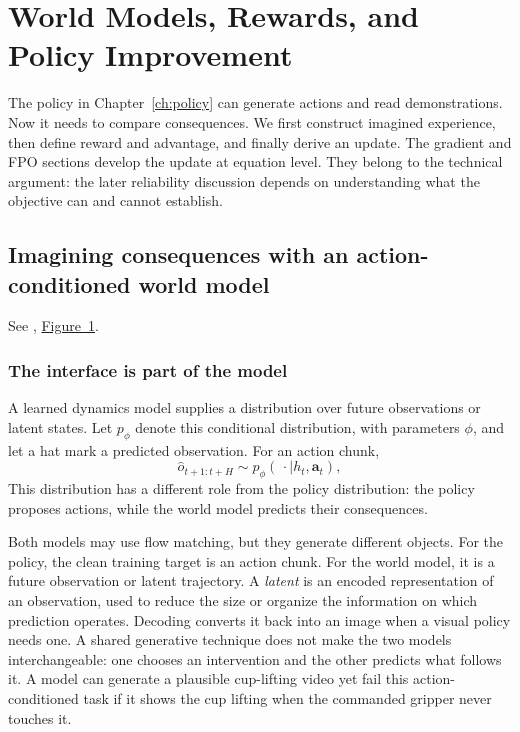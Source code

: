 \chapter{World Models, Rewards, and Policy Improvement}
\label{ch:story}
The policy in Chapter~\ref{ch:policy} can generate actions and read demonstrations. Now it needs to compare consequences. We first construct imagined experience, then define reward and advantage, and finally derive an update. The gradient and FPO sections develop the update at equation level. They belong to the technical argument: the later reliability discussion depends on understanding what the objective can and cannot establish.

\section{Imagining consequences with an action-conditioned world model}
\noindent See \citet{ctrl}, \href{https://arxiv.org/pdf/2510.10125v3}{Figure~1}.


\subsection{The interface is part of the model}
A learned dynamics model supplies a distribution over future observations or latent states. Let $p_\phi$ denote this conditional distribution, with parameters $\phi$, and let a hat mark a predicted observation. For an action chunk,
\begin{equation}
 \widehat o_{t+1:t+H}\sim p_\phi(\,\cdot\mid h_t,\mathbf a_t),
 \label{eq:world}
\end{equation}
This distribution has a different role from the policy distribution: the policy proposes actions, while the world model predicts their consequences.

Both models may use flow matching, but they generate different objects. For the policy, the clean training target is an action chunk. For the world model, it is a future observation or latent trajectory. A \emph{latent} is an encoded representation of an observation, used to reduce the size or organize the information on which prediction operates. Decoding converts it back into an image when a visual policy needs one. A shared generative technique does not make the two models interchangeable: one chooses an intervention and the other predicts what follows it. A model can generate a plausible cup-lifting video yet fail this action-conditioned task if it shows the cup lifting when the commanded gripper never touches it.

